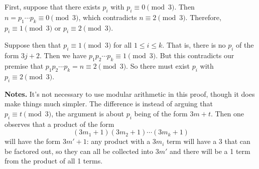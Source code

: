 \documentclass[11pt]{article}
\begin{document}
\begin{enumerate}[leftmargin=*]
  First, suppose that there exists $p_i$ with $p_i \equiv 0 \pmod 3$. Then $n = p_1 \cdots p_k \equiv 0 \pmod 3$, which contradicts $n \equiv 2 \pmod 3$. Therefore, $p_i \equiv 1 \pmod 3$ or $p_i \equiv 2 \pmod 3$.

  Suppose then that $p_i \equiv 1 \pmod 3$ for all $1 \le i \le k$. That is, there is no $p_i$ of the form $3j+2$. Then we have $p_1p_2 \cdots p_k \equiv 1 \pmod 3$. But this contradicts our premise that $p_1p_2 \cdots p_k = n \equiv 2 \pmod 3$. So there must exist $p_i$ with $p_i \equiv 2 \pmod 3$.

  \textbf{Notes.} It's not necessary to use modular arithmetic in this proof, though it does make things much simpler. The difference is instead of arguing that $p_i \equiv t \pmod 3$, the argument is about $p_i$ being of the form $3m+t$. Then one observes that a product of the form
  \[
    (3m_1+1)(3m_2+1)\cdots(3m_k+1)
  \]
  will have the form $3m' + 1$: any product with a $3m_i$ term will have a 3 that can be factored out, so they can all be collected into $3m'$ and there will be a 1 term from the product of all 1 terms.
\end{enumerate}
\end{document}
